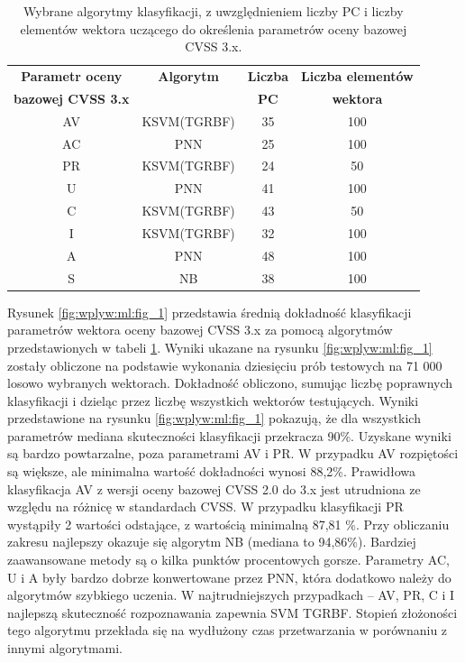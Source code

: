 \begin{table}[htbp]
\caption{Wybrane algorytmy klasyfikacji, z uwzględnieniem liczby PC i liczby elementów wektora uczącego do określenia parametrów oceny bazowej CVSS 3.x.}
\begin{center}
\begin{tabular}{cccc}
\hline
\textbf{Parametr oceny} & \textbf{Algorytm}   & \textbf{Liczba}  & \textbf{Liczba elementów}  \\
\textbf{bazowej CVSS 3.x}  &             & \textbf{PC}    & \textbf{wektora}    \\
\hline
AV           & KSVM(TGRBF)    & 35     & 100   \\
AC           & PNN            & 25     & 100   \\
PR           & KSVM(TGRBF)    & 24     & 50    \\
U            & PNN            & 41     & 100   \\
C            & KSVM(TGRBF)    & 43     & 50    \\
I            & KSVM(TGRBF)    & 32     & 100   \\
A            & PNN            & 48     & 100   \\
S            & NB             & 38     & 100   \\
\hline
\end{tabular}
\label{tab2}
\end{center}
\end{table}

\bigbreak
Rysunek \ref{fig:wplyw:ml:fig_1} przedstawia średnią dokładność klasyfikacji parametrów wektora oceny bazowej CVSS 3.x za pomocą algorytmów przedstawionych w tabeli \ref{tab2}. Wyniki ukazane na rysunku \ref{fig:wplyw:ml:fig_1} zostały obliczone na podstawie wykonania dziesięciu prób testowych na 71 000 losowo wybranych wektorach. Dokładność obliczono, sumując liczbę poprawnych klasyfikacji i dzieląc przez liczbę wszystkich wektorów testujących. Wyniki przedstawione na rysunku \ref{fig:wplyw:ml:fig_1} pokazują, że dla wszystkich parametrów mediana skuteczności klasyfikacji przekracza 90\%. Uzyskane wyniki są bardzo powtarzalne, poza parametrami AV i PR. W przypadku AV rozpiętości są większe, ale minimalna wartość dokładności wynosi 88,2\%. Prawidłowa klasyfikacja AV z wersji oceny bazowej CVSS 2.0 do 3.x jest utrudniona ze względu na różnicę w standardach CVSS. W przypadku klasyfikacji PR wystąpiły 2 wartości odstające, z wartością minimalną 87,81 \%. Przy obliczaniu zakresu najlepszy okazuje się algorytm NB (mediana to 94,86\%). Bardziej zaawansowane metody są o kilka punktów procentowych gorsze. Parametry AC, U i A były bardzo dobrze konwertowane przez PNN, która dodatkowo należy do algorytmów szybkiego uczenia. W najtrudniejszych przypadkach – AV, PR, C i I najlepszą skuteczność rozpoznawania zapewnia SVM TGRBF. Stopień złożoności tego algorytmu przekłada się na wydłużony czas przetwarzania w porównaniu z innymi algorytmami.

